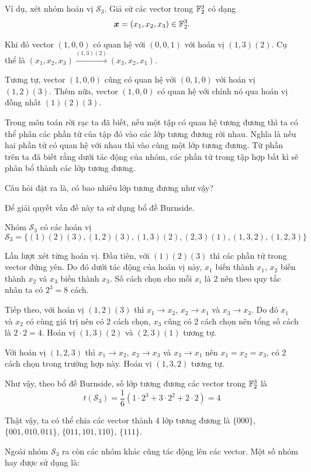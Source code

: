 Ví dụ, xét nhóm hoán vị $\mathcal{S}_3$. Giả sử các vector trong $\mathbb{F}_2^3$ có dạng \[ \bm{x} = (x_1, x_2, x_3) \in \mathbb{F}_2^3. \] 

Khi đó vector $(1, 0, 0)$ có quan hệ với $(0, 0, 1)$ với hoán vị $(1, 3)(2)$. Cụ thể là $(x_1, x_2, x_3) \xrightarrow{(1, 3)(2)} (x_3, x_2, x_1)$.

Tương tự, vector $(1, 0, 0)$ cũng có quan hệ với $(0, 1, 0)$ với hoán vị $(1, 2)(3)$. Thêm nữa, vector $(1, 0, 0)$ có quan hệ với chính nó qua hoán vị đồng nhất $(1)(2)(3)$.

Trong môn toán rời rạc ta đã biết, nếu một tập có quan hệ tương đương thì ta có thể phân các phần tử của tập đó vào các lớp tương đương rời nhau. Nghĩa là nếu hai phần tử có quan hệ với nhau thì vào cùng một lớp tương đương. Từ phần trên ta đã biết rằng dưới tác động của nhóm, các phần tử trong tập hợp bất kì sẽ phân bổ thành các lớp tương đương.

Câu hỏi đặt ra là, có bao nhiêu lớp tương đương như vậy?

Để giải quyết vấn đề này ta sử dụng bổ đề Burnside.

Nhóm $\mathcal{S}_3$ có các hoán vị \[ \mathcal{S}_3 = \{ (1)(2)(3), (1, 2)(3), (1, 3)(2), (2, 3)(1), (1, 3, 2), (1, 2, 3) \} \]

Lần lượt xét từng hoán vị. Đầu tiên, với $(1)(2)(3)$ thì các phần tử trong vector đứng yên. Do đó dưới tác động của hoán vị này, $x_1$ biến thành $x_1$, $x_2$ biến thành $x_2$ và $x_3$ biến thành $x_3$. Số cách chọn cho mỗi $x_i$ là 2 nên theo quy tắc nhân ta có $2^3 = 8$ cách.

Tiếp theo, với hoán vị $(1, 2)(3)$ thì $x_1 \to x_2$, $x_2 \to x_1$ và $x_3 \to x_3$. Do đó $x_1$ và $x_2$ có cùng giá trị nên có 2 cách chọn, $x_3$ cũng có 2 cách chọn nên tổng số cách là $2 \cdot 2 = 4$. Hoán vị $(1, 3)(2)$ và $(2, 3)(1)$ tương tự.

Với hoán vị $(1, 2, 3)$ thì $x_1 \to x_2$, $x_2 \to x_3$ và $x_3 \to x_1$ nên $x_1 = x_2 = x_3$, có 2 cách chọn trong trường hợp này. Hoán vị $(1, 3, 2)$ tương tự.

Như vậy, theo bổ đề Burnside, số lớp tương đương các vector trong $\mathbb{F}_2^3$ là \[ t(\mathcal{S}_3) = \frac{1}{6} (1 \cdot 2^3 + 3 \cdot 2^2 + 2 \cdot 2) = 4 \]

Thật vậy, ta có thể chia các vector thành 4 lớp tương đương là $\{ 000 \}$, $\{ 001, 010, 011 \}$, $\{ 011, 101, 110 \}$, $\{ 111 \}$.

Ngoài nhóm $\mathcal{S}_3$ ra còn các nhóm khác cũng tác động lên các vector. Một số nhóm hay được sử dụng là:

